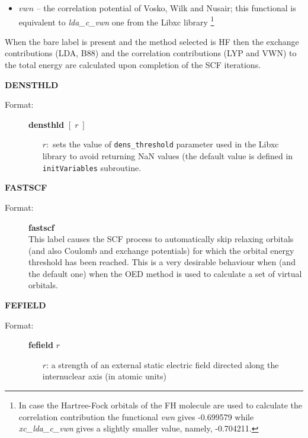 \documentclass[10pt,a4paper]{article}
\newcommand{\ft}[1]{\texttt{#1}}
\begin{document}
\begin{description}
\begin{description}
\begin{itemize}
\begin{itemize}
\item $vwn$ -- the correlation potential of Vosko, Wilk and Nusair;
  this functional is equivalent to \textsl{lda\_c\_vwn} one from the Libxc library%
    \footnote{In case the Hartree-Fock orbitals of the FH molecule are used to calculate
      the correlation contribution the functional \textsl{vwn} gives -0.699579 while
      \textsl{xc\_lda\_c\_vwn} gives a slightly smaller value, namely, -0.704211.}

\end{itemize}
\end{itemize}
\end{description}
When the bare label is present and the method selected is HF then the exchange
contributions (LDA, B88) and the correlation contributions (LYP and VWN) to the total
energy are calculated upon completion of the SCF iterations.

\item \textbf{DENSTHLD}
\begin{description}
\item[Format:] \textbf{densthld}  $[\;r\;]$ \\
\begin{itemize}
\item[$r:$] sets the value of \texttt{dens\_threshold} parameter used in the
  Libxc library to avoid returning NaN values (the default value is defined in
  \ft{initVariables} subroutine.%
\end{itemize}
\end{description}

\item \textbf{FASTSCF}
\begin{description}
\item[Format:] \textbf{fastscf} \\
  This label causes the SCF process to automatically skip relaxing orbitals
  (and also Coulomb and exchange potentials) for which the orbital energy
  threshold has been reached. This is a very desirable behaviour when
  (and the default one) when the OED method is used to calculate a set of
  virtual orbitals.
   \end{description}

\item \textbf{FEFIELD}
\begin{description}
\item[Format:] \textbf{fefield} $r$
\begin{itemize}
\item[$r$:] a strength of an external static electric field directed along
  the internuclear axis (in atomic units)
\end{itemize}
\end{description}




\end{description}
\end{document}
